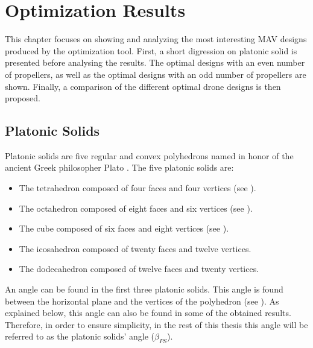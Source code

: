 \chapter{Optimization Results}
\label{sec:optimization_results}
This chapter focuses on showing and analyzing the most interesting MAV designs
produced by the optimization tool. First, a short digression on platonic solid is
presented before analysing the results. The optimal designs with an
even number of propellers, as well as the optimal designs with an odd number of
propellers are shown. Finally, a comparison of the different optimal drone designs
is then proposed.

\section{Platonic Solids}
\label{sec:platonic_solids}
Platonic solids are five regular and convex polyhedrons named in honor of the
ancient Greek philosopher Plato \citep{noauthor_platonic_2018}. The five platonic
solids are:
{\small\begin{itemize}
\item The tetrahedron composed of four faces and four vertices (see ).
\item The octahedron composed of eight faces and six vertices (see ).
\item The cube composed of six faces and eight vertices (see ).
\item The icosahedron composed of twenty faces and twelve vertices.
\item The dodecahedron composed of twelve faces and twenty vertices.
\end{itemize}}
An angle can be found in the first three platonic solids. This angle is
found between the horizontal plane and the vertices of the polyhedron (see
). As explained below, this angle can also be found in
some of the obtained results. Therefore, in order to ensure simplicity, in the
rest of this thesis this angle will be referred to as the platonic solids' angle
($\beta_{PS}$).

